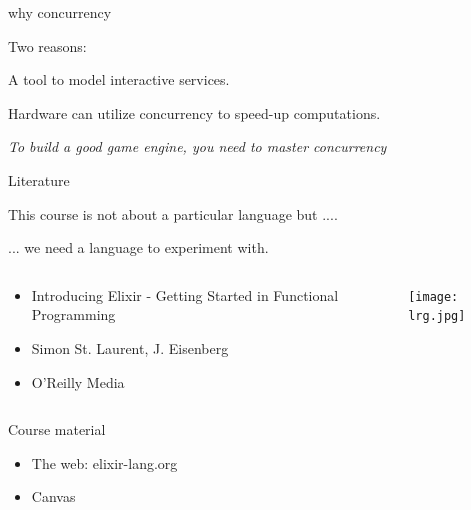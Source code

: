 \begin{frame}{why concurrency}

Two reasons:

\pause\vspace{20pt}\hspace{60pt}A tool to model interactive services.

\pause\vspace{20pt}\hspace{60pt}Hardware can utilize concurrency to speed-up computations.

\pause\vspace{40pt}
{\em To build a good game engine, you need to master concurrency}

\end{frame}


\begin{frame}{Literature}

  This course is not about a particular language but .... \pause

  \vspace{20pt}\hspace{40pt} ... we need a language to experiment with.

\pause
\begin{columns}
 \begin{column}{0.6\linewidth}
   \begin{itemize}
   \item Introducing Elixir - Getting Started in Functional Programming
   \item Simon St. Laurent, J. Eisenberg
   \item O'Reilly Media
   \end{itemize}
 \end{column}
 \begin{column}{0.4\linewidth}
    \texttt{[image: lrg.jpg]}
 \end{column}
\end{columns}

\end{frame}

\begin{frame}{Course material}

  \begin{itemize}
   \item The web:  elixir-lang.org
   \item Canvas
  \end{itemize}  

\end{frame}

